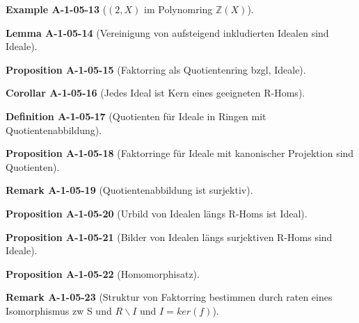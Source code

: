 \documentclass[10pt, letterpaper]{article}
\newcommand{\Z}{\mathbb{Z}}
\newcommand{\CustomHeading}[3]{%
  \par\medskip\noindent%
  \textbf{#1 #2} \textnormal{(#3)}.\enskip%
}
\newenvironment{DEF}[2]{\CustomHeading{Definition}{#1}{#2}}{}
\newenvironment{PROP}[2]{\CustomHeading{Proposition}{#1}{#2}}{}
\newenvironment{LEM}[2]{\CustomHeading{Lemma}{#1}{#2}}{}
\newenvironment{KORO}[2]{\CustomHeading{Corollar}{#1}{#2}}{}
\newenvironment{REM}[2]{\CustomHeading{Remark}{#1}{#2}}{}
\newenvironment{EXA}[2]{\CustomHeading{Example}{#1}{#2}}{}
\begin{document}
\begin{EXA}{A-1-05-13}{$(2,X)$ im Polynomring $\Z(X)$}
\end{EXA}

\begin{LEM}{A-1-05-14}{Vereinigung von aufsteigend inkludierten Idealen sind Ideale}
\end{LEM}

\begin{PROP}{A-1-05-15}{Faktorring als Quotientenring bzgl, Ideale}
\end{PROP}

\begin{KORO}{A-1-05-16}{Jedes Ideal ist Kern eines geeigneten R-Homs}
\end{KORO}

\begin{DEF}{A-1-05-17}{Quotienten für Ideale in Ringen mit Quotientenabbildung}
\end{DEF}

\begin{PROP}{A-1-05-18}{Faktorringe für Ideale mit kanonischer Projektion sind Quotienten}
\end{PROP}

\begin{REM}{A-1-05-19}{Quotientenabbildung ist surjektiv}
\end{REM}

\begin{PROP}{A-1-05-20}{Urbild von Idealen längs R-Homs ist Ideal}
\end{PROP}

\begin{PROP}{A-1-05-21}{Bilder von Idealen längs surjektiven R-Homs sind Ideale}
\end{PROP}

\begin{PROP}{A-1-05-22}{Homomorphisatz}
\end{PROP}

\begin{REM}{A-1-05-23}{Struktur von Faktorring bestimmen durch raten eines Isomorphismus zw S und $R\backslash I$ und $I=ker(f)$}
\end{REM}
\end{document}
